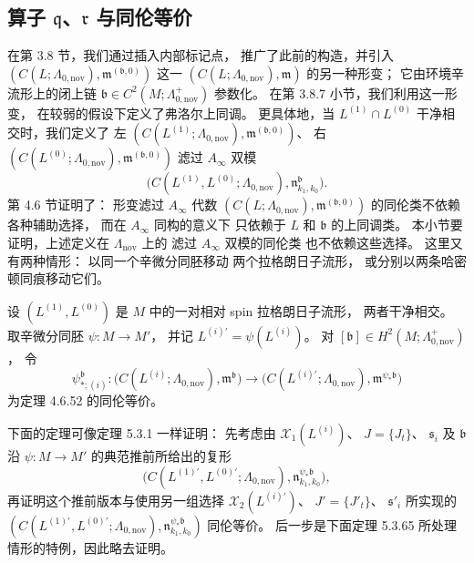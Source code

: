 
\subsection{算子 \texorpdfstring{$\mathfrak q$、$\mathfrak r$}{q、r} 与同伦等价}
\label{subsec:5-3-6}

在第 3.8 节，我们通过插入内部标记点，
推广了此前的构造，并引入
$(C(L;\Lambda_{0,\mathrm{nov}}),
\mathfrak m^{(\mathfrak b,0)})$
这一
$(C(L;\Lambda_{0,\mathrm{nov}}),\mathfrak m)$
的另一种形变；
它由环境辛流形上的闭上链
$\mathfrak b\in
C^2(M;\Lambda^+_{0,\mathrm{nov}})$
参数化。
在第 3.8.7 小节，我们利用这一形变，
在较弱的假设下定义了弗洛尔上同调。
更具体地，当
$L^{(1)}\cap L^{(0)}$
干净相交时，我们定义了
左
$(C(L^{(1)};\Lambda_{0,\mathrm{nov}}),
\mathfrak m^{(\mathfrak b,0)})$、
右
$(C(L^{(0)};\Lambda_{0,\mathrm{nov}}),
\mathfrak m^{(\mathfrak b,0)})$
滤过 $A_\infty$ 双模
\[
\bigl(
C(L^{(1)},L^{(0)};\Lambda_{0,\mathrm{nov}}),
\mathfrak n^{\mathfrak b}_{k_1,k_0}
\bigr).
\]
第 4.6 节证明了：
形变滤过 $A_\infty$ 代数
$(C(L;\Lambda_{0,\mathrm{nov}}),
\mathfrak m^{(\mathfrak b,0)})$
的同伦类不依赖各种辅助选择，
而在 $A_\infty$ 同构的意义下
只依赖于 $L$ 和 $\mathfrak b$ 的上同调类。
本小节要证明，上述定义在
$\Lambda_{\mathrm{nov}}$ 上的
滤过 $A_\infty$ 双模的同伦类
也不依赖这些选择。
这里又有两种情形：
以同一个辛微分同胚移动
两个拉格朗日子流形，
或分别以两条哈密顿同痕移动它们。

设 $(L^{(1)},L^{(0)})$
是 $M$ 中的一对相对 spin
拉格朗日子流形，
两者干净相交。
取辛微分同胚
$\psi\colon M\to M'$，
并记
$L^{(i)\prime}=\psi(L^{(i)})$。
对
$[\mathfrak b]\in
H^2(M;\Lambda^+_{0,\mathrm{nov}})$，
令
\[
\psi^{\mathfrak b}_{*;(i)}\colon
\bigl(
C(L^{(i)};\Lambda_{0,\mathrm{nov}}),
\mathfrak m^{\mathfrak b}
\bigr)
\longrightarrow
\bigl(
C(L^{(i)\prime};\Lambda_{0,\mathrm{nov}}),
\mathfrak m^{\psi_*\mathfrak b}
\bigr)
\]
为定理 4.6.52 的同伦等价。

下面的定理可像定理 5.3.1 一样证明：
先考虑由
$\mathcal X_1(L^{(i)})$、
$J=\{J_t\}$、
$\mathfrak s_i$ 及 $\mathfrak b$
沿 $\psi\colon M\to M'$
的典范推前所给出的复形
\[
\bigl(
C(L^{(1)\prime},L^{(0)\prime};
\Lambda_{0,\mathrm{nov}}),
\mathfrak n_{k_1,k_0}^{\psi_*\mathfrak b}
\bigr),
\]
再证明这个推前版本与使用另一组选择
$\mathcal X_2(L^{(i)\prime})$、
$J'=\{J'_t\}$、
$\mathfrak s'_i$
所实现的
$(C(L^{(1)\prime},L^{(0)\prime};
\Lambda_{0,\mathrm{nov}}),
\mathfrak n_{k_1,k_0}^{\psi_*\mathfrak b})$
同伦等价。
后一步是下面定理 5.3.65
所处理情形的特例，因此略去证明。

